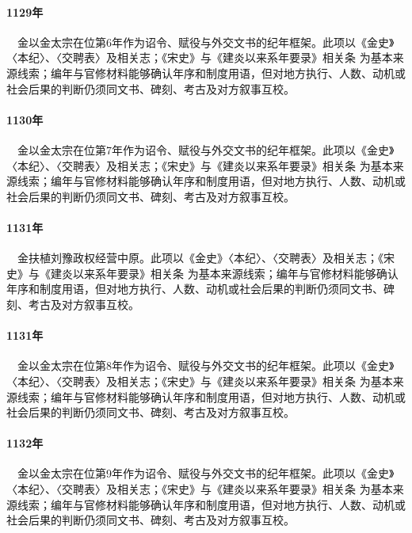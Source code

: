\paragraph{1129年}　金以金太宗在位第6年作为诏令、赋役与外交文书的纪年框架。此项以《金史》〈本纪〉、〈交聘表〉及相关志；《宋史》与《建炎以来系年要录》相关条 为基本来源线索；编年与官修材料能够确认年序和制度用语，但对地方执行、人数、动机或社会后果的判断仍须同文书、碑刻、考古及对方叙事互校。

\paragraph{1130年}　金以金太宗在位第7年作为诏令、赋役与外交文书的纪年框架。此项以《金史》〈本纪〉、〈交聘表〉及相关志；《宋史》与《建炎以来系年要录》相关条 为基本来源线索；编年与官修材料能够确认年序和制度用语，但对地方执行、人数、动机或社会后果的判断仍须同文书、碑刻、考古及对方叙事互校。

\paragraph{1131年}　金扶植刘豫政权经营中原。此项以《金史》〈本纪〉、〈交聘表〉及相关志；《宋史》与《建炎以来系年要录》相关条 为基本来源线索；编年与官修材料能够确认年序和制度用语，但对地方执行、人数、动机或社会后果的判断仍须同文书、碑刻、考古及对方叙事互校。

\paragraph{1131年}　金以金太宗在位第8年作为诏令、赋役与外交文书的纪年框架。此项以《金史》〈本纪〉、〈交聘表〉及相关志；《宋史》与《建炎以来系年要录》相关条 为基本来源线索；编年与官修材料能够确认年序和制度用语，但对地方执行、人数、动机或社会后果的判断仍须同文书、碑刻、考古及对方叙事互校。

\paragraph{1132年}　金以金太宗在位第9年作为诏令、赋役与外交文书的纪年框架。此项以《金史》〈本纪〉、〈交聘表〉及相关志；《宋史》与《建炎以来系年要录》相关条 为基本来源线索；编年与官修材料能够确认年序和制度用语，但对地方执行、人数、动机或社会后果的判断仍须同文书、碑刻、考古及对方叙事互校。

